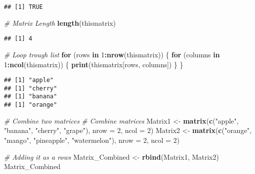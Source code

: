 \documentclass[
]{article}
\newenvironment{Shaded}{\begin{snugshade}}{\end{snugshade}}
\newcommand{\AttributeTok}[1]{\textcolor[rgb]{0.13,0.29,0.53}{#1}}
\newcommand{\CommentTok}[1]{\textcolor[rgb]{0.56,0.35,0.01}{\textit{#1}}}
\newcommand{\ControlFlowTok}[1]{\textcolor[rgb]{0.13,0.29,0.53}{\textbf{#1}}}
\newcommand{\DecValTok}[1]{\textcolor[rgb]{0.00,0.00,0.81}{#1}}
\newcommand{\FunctionTok}[1]{\textcolor[rgb]{0.13,0.29,0.53}{\textbf{#1}}}
\newcommand{\NormalTok}[1]{#1}
\newcommand{\OtherTok}[1]{\textcolor[rgb]{0.56,0.35,0.01}{#1}}
\newcommand{\SpecialCharTok}[1]{\textcolor[rgb]{0.81,0.36,0.00}{\textbf{#1}}}
\newcommand{\StringTok}[1]{\textcolor[rgb]{0.31,0.60,0.02}{#1}}
\begin{document}
\begin{verbatim}
## [1] TRUE
\end{verbatim}

\begin{Shaded}
\begin{Highlighting}[]
\CommentTok{\# Matrix Length}
\FunctionTok{length}\NormalTok{(thismatrix)}
\end{Highlighting}
\end{Shaded}

\begin{verbatim}
## [1] 4
\end{verbatim}

\begin{Shaded}
\begin{Highlighting}[]
\CommentTok{\# Loop trough list}
\ControlFlowTok{for}\NormalTok{ (rows }\ControlFlowTok{in} \DecValTok{1}\SpecialCharTok{:}\FunctionTok{nrow}\NormalTok{(thismatrix)) \{}
  \ControlFlowTok{for}\NormalTok{ (columns }\ControlFlowTok{in} \DecValTok{1}\SpecialCharTok{:}\FunctionTok{ncol}\NormalTok{(thismatrix)) \{}
    \FunctionTok{print}\NormalTok{(thismatrix[rows, columns])}
\NormalTok{  \}}
\NormalTok{\}}
\end{Highlighting}
\end{Shaded}

\begin{verbatim}
## [1] "apple"
## [1] "cherry"
## [1] "banana"
## [1] "orange"
\end{verbatim}

\begin{Shaded}
\begin{Highlighting}[]
\CommentTok{\# Combine two matrices}
\CommentTok{\# Combine matrices}
\NormalTok{Matrix1 }\OtherTok{\textless{}{-}} \FunctionTok{matrix}\NormalTok{(}\FunctionTok{c}\NormalTok{(}\StringTok{"apple"}\NormalTok{, }\StringTok{"banana"}\NormalTok{, }\StringTok{"cherry"}\NormalTok{, }\StringTok{"grape"}\NormalTok{), }\AttributeTok{nrow =} \DecValTok{2}\NormalTok{, }\AttributeTok{ncol =} \DecValTok{2}\NormalTok{)}
\NormalTok{Matrix2 }\OtherTok{\textless{}{-}} \FunctionTok{matrix}\NormalTok{(}\FunctionTok{c}\NormalTok{(}\StringTok{"orange"}\NormalTok{, }\StringTok{"mango"}\NormalTok{, }\StringTok{"pineapple"}\NormalTok{, }\StringTok{"watermelon"}\NormalTok{), }\AttributeTok{nrow =} \DecValTok{2}\NormalTok{, }\AttributeTok{ncol =} \DecValTok{2}\NormalTok{)}

\CommentTok{\# Adding it as a rows}
\NormalTok{Matrix\_Combined }\OtherTok{\textless{}{-}} \FunctionTok{rbind}\NormalTok{(Matrix1, Matrix2)}
\NormalTok{Matrix\_Combined}
\end{Highlighting}
\end{Shaded}
\end{document}
